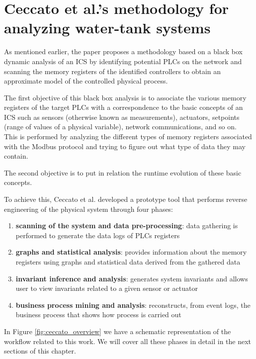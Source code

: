 \section{Ceccato et al.’s methodology for analyzing water-tank systems}
\label{sec:ceccato_metodology}
As mentioned earlier, the paper proposes a methodology based on a black box dynamic analysis of an ICS by identifying potential PLCs on the network and scanning the memory registers of the identified controllers to obtain an approximate model of the controlled physical process.

\bigskip
The first objective of this black box analysis is to associate the various memory registers of the target PLCs with a correspondence to the basic concepts of an ICS such as sensors (otherwise known as measurements), actuators, setpoints (range of values of a physical variable), network communications, and so on.\\
This is performed by analyzing the different types of memory registers associated with the Modbus protocol and trying to figure out what type of data they may contain.

The second objective is to put in relation the runtime evolution of these basic concepts.

\bigskip
To achieve this, Ceccato et al. developed a prototype tool \cite{plc_re} that performs reverse engineering of the physical system through four phases:

\begin{enumerate}
	\item \textbf{scanning of the system and data pre-processing}: data gathering is performed to generate the data logs of PLCs registers
	
	\item \textbf{graphs and statistical analysis}: provides information about the memory registers using graphs and statistical data derived from the gathered data
	
	\item \textbf{invariant inference and analysis}: generates system invariants and allows user to view invariants related to a given sensor or actuator
	
	\item \textbf{business process mining and analysis}: reconstructs, from event logs, the business process that shows how process is carried out
\end{enumerate}

In Figure \ref{fig:ceccato_overview} we have a schematic representation of the workflow related to this work. We will cover all these phases in detail in the next sections of this chapter. 

